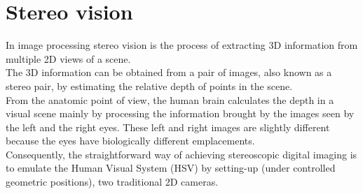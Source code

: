 \section{Stereo vision}
In image processing stereo vision is the process of extracting 3D information from multiple 2D views of a scene\cite{SV}.\\
The 3D information can be obtained from a pair of images, also known as a stereo pair, by estimating the relative depth of points in the scene.\\
From the anatomic point of view, the human brain calculates the depth in a visual scene mainly by
processing the information brought by the images seen by the left and the right eyes. These left and right images are slightly different because the eyes have biologically different emplacements.\\
Consequently, the straightforward way of achieving stereoscopic digital imaging is to emulate the
Human Visual System (HSV) by setting-up (under controlled geometric positions), two traditional 2D
cameras.\\
